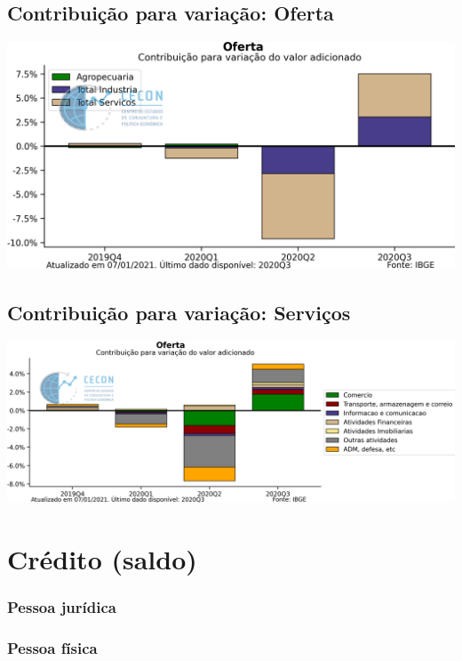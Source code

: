 \documentclass{SelfArx}
\begin{document}
\subsection*{Contribuição para variação: Oferta}
\label{sec:org6c547c9}

\begin{center}
\includegraphics[width=.9\linewidth]{./figs/PIB/Contrib_Oferta.png}
\end{center}


\subsection*{Contribuição para variação: Serviços}
\label{sec:orgcd02aef}

\begin{center}
\includegraphics[width=.9\linewidth]{./figs/PIB/Contrib_Servicos.png}
\end{center}

\section*{Crédito (saldo)}
\label{sec:org1416c94}



\subsubsection*{Pessoa jurídica}
\label{sec:orge2760b7}

\subsubsection*{Pessoa física}
\label{sec:org3004b25}
\end{document}
